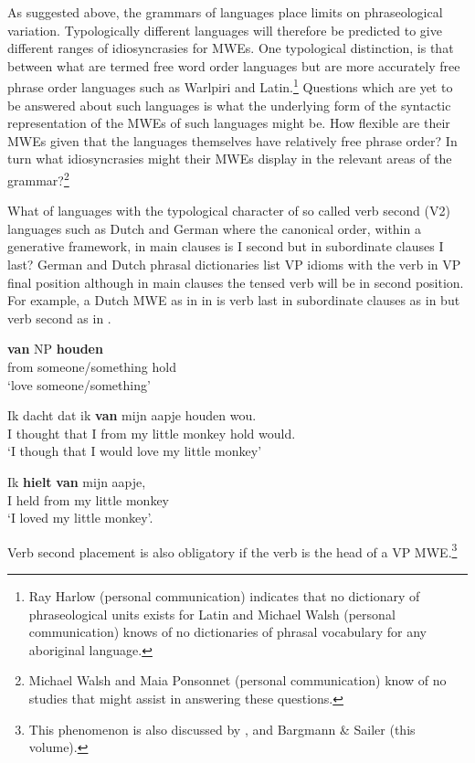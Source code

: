\documentclass[output=paper]{langsci/langscibook}
\begin{document}
As suggested above, the grammars of languages place limits on phraseological variation. Typologically different languages will therefore be predicted to give different ranges of idiosyncrasies for MWEs. One typological distinction, is that between what are termed free word order languages but are more accurately free phrase order languages such as Warlpiri  and Latin.\footnote{   Ray Harlow (personal communication) indicates that no dictionary of  phraseological units exists for Latin and Michael Walsh (personal communication) knows of no dictionaries of phrasal vocabulary for any aboriginal language.}  Questions which are yet to be answered about such languages is what the underlying form of the syntactic representation of the MWEs of such languages might be. How flexible are their MWEs given that the languages themselves have relatively free phrase order? In turn what idiosyncrasies might their MWEs display in the relevant areas of the grammar?\footnote{   Michael Walsh and Maia Ponsonnet (personal communication) know of no studies that might assist in answering these questions.}

What of languages with the typological character of so called verb second (V2) languages such as Dutch and German where the canonical order, within a generative framework, in main clauses is I second but in subordinate clauses I last? German and Dutch phrasal dictionaries list VP idioms with the verb in VP final position although in main clauses the tensed verb will be in second position. For example, a Dutch MWE as in in  is verb last in subordinate clauses as in  but verb second as in .

\ea\label{ex:ex50}
\gll \textbf{van} NP \textbf{houden}\\
             from someone/something hold\\
\glt ‘love someone/something’
\z


\ea\label{ex:ex51}
\gll   Ik  dacht    dat  ik \textbf{van} mijn aapje houden  wou. \\
I   thought that I  from my  {little monkey} hold      would. \\
\glt ‘I though that I would love my little monkey’
\z

\ea\label{ex:ex52}
\gll Ik \textbf{hielt} \textbf{van} mijn aapje,\\
I  held  from my  {little monkey}\\
\glt ‘I loved my little monkey’. 
\z

Verb second placement is also obligatory if the verb is the head of a VP MWE.\footnote{    This phenomenon is also discussed by \citet{Schenk:95}, \citet{Nunberg1994} and Bargmann \& Sailer (this volume).}
\end{document}
